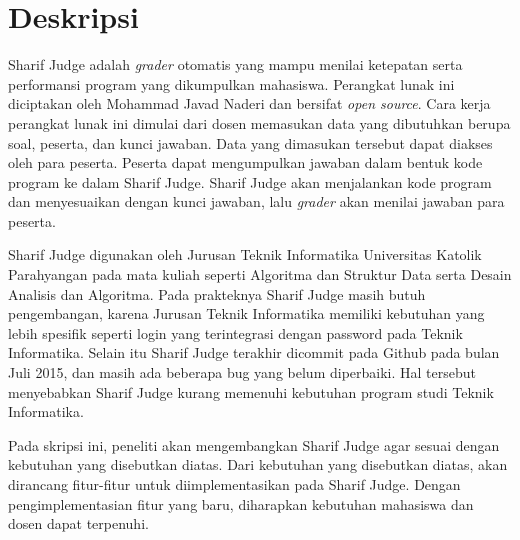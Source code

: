 \documentclass[a4paper,twoside]{article}
\begin{document}
\title{\@judultopik}
\author{\nama \textendash \@npm} 

\newcommand{\nama}{Stillmen Vallian}
\newcommand{\@npm}{2014730083}
\newcommand{\@judultopik}{Kustomisasi Sharif Judge untuk Kebutuhan Program Studi Teknik Informatika} %
\newcommand{\jumpemb}{1} %
\newcommand{\tanggal}{12/09/2017}


\maketitle


\section{Deskripsi}
Sharif Judge adalah \textit{grader} otomatis yang mampu menilai ketepatan serta performansi program yang dikumpulkan mahasiswa. Perangkat lunak ini diciptakan oleh Mohammad Javad Naderi dan bersifat \textit{open source}. Cara kerja perangkat lunak ini dimulai dari dosen memasukan data yang dibutuhkan berupa soal, peserta, dan kunci jawaban. Data yang dimasukan tersebut dapat diakses oleh para peserta. Peserta dapat mengumpulkan jawaban dalam bentuk kode program ke dalam Sharif Judge. Sharif Judge akan menjalankan kode program dan menyesuaikan dengan kunci jawaban, lalu \textit{grader} akan menilai jawaban para peserta.

Sharif Judge digunakan oleh Jurusan Teknik Informatika Universitas Katolik Parahyangan pada mata kuliah seperti Algoritma dan Struktur Data serta Desain Analisis dan Algoritma. Pada prakteknya Sharif Judge masih butuh pengembangan, karena Jurusan Teknik Informatika memiliki kebutuhan yang lebih spesifik seperti login yang terintegrasi dengan password pada Teknik Informatika. Selain itu Sharif Judge terakhir dicommit pada Github pada bulan Juli 2015, dan masih ada beberapa bug yang belum diperbaiki. Hal tersebut menyebabkan Sharif Judge kurang memenuhi kebutuhan program studi Teknik Informatika. 

Pada skripsi ini, peneliti akan mengembangkan Sharif Judge agar sesuai dengan kebutuhan yang disebutkan diatas. Dari kebutuhan yang disebutkan diatas, akan dirancang fitur-fitur untuk diimplementasikan pada Sharif Judge. Dengan pengimplementasian fitur yang baru, diharapkan kebutuhan mahasiswa dan dosen dapat terpenuhi.
\end{document}
